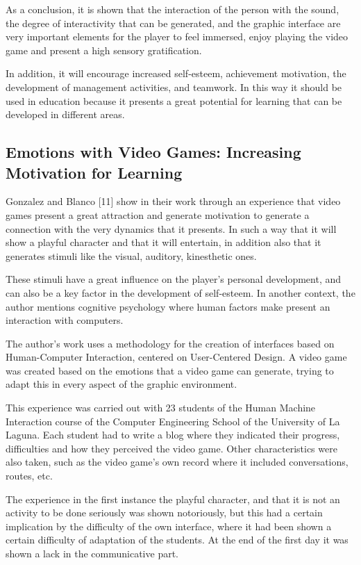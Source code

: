 \documentclass[conference, letterpaper]{IEEEtran}
\begin{document}
As a conclusion, it is shown that the interaction of the person with the sound, the degree of interactivity that can be generated, and the graphic interface are very important elements for the player to feel immersed, enjoy playing the video game and present a high sensory gratification.   

In addition, it will encourage increased self-esteem, achievement motivation, the development of management activities, and teamwork. In this way it should be used in education because it presents a great potential for learning that can be developed in different areas.

\subsection{Emotions with Video Games: Increasing Motivation for Learning}
Gonzalez and Blanco [11] show in their work through an experience that video games present a great attraction and generate motivation to generate a connection with the very dynamics that it presents. In such a way that it will show a playful character and that it will entertain, in addition also that it generates stimuli like the visual, auditory, kinesthetic ones.  

These stimuli have a great influence on the player's personal development, and can also be a key factor in the development of self-esteem. In another context, the author mentions cognitive psychology where human factors make present an interaction with computers.  

The author's work uses a methodology for the creation of interfaces based on Human-Computer Interaction, centered on User-Centered Design. A video game was created based on the emotions that a video game can generate, trying to adapt this in every aspect of the graphic environment.

This experience was carried out with 23 students of the Human Machine Interaction course of the Computer Engineering School of the University of La Laguna.  Each student had to write a blog where they indicated their progress, difficulties and how they perceived the video game. Other characteristics were also taken, such as the video game's own record where it included conversations, routes, etc.  

The experience in the first instance the playful character, and that it is not an activity to be done seriously was shown notoriously, but this had a certain implication by the difficulty of the own interface, where it had been shown a certain difficulty of adaptation of the students. At the end of the first day it was shown a lack in the communicative part.
\end{document}
